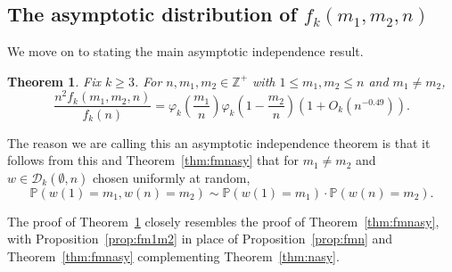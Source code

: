 \documentclass{amsart}
\newtheorem{theorem}{Theorem}[section]
\newtheorem{proposition}[theorem]{Proposition}
\theoremstyle{definition}
\begin{document}

\subsection{The asymptotic distribution of $f_k(m_1,m_2,n)$} We move on to stating the main asymptotic independence result.

\begin{theorem}\label{thm:joint}
Fix $k\geq 3$. For $n,m_1,m_2\in \mathbb{Z}^+$ with $1\leq m_1, m_2\leq n$ and $m_1\neq m_2$,
\[\frac{n^2 f_k(m_1,m_2,n)}{f_k(n)}=\varphi_k\left(\frac{m_1}{n}\right)\varphi_k\left(1-\frac{m_2}{n}\right)\left(1+O_k\left(n^{-0.49}\right)\right).\]
\end{theorem}

The reason we are calling this an asymptotic independence theorem is that it follows from this and Theorem~\ref{thm:fmnasy} that for $m_1\neq m_2$ and $w\in \mathcal{D}_k(\emptyset,n)$ chosen uniformly at random,
\[\mathbb{P}(w(1)=m_1,w(n)=m_2)\sim \mathbb{P}\left(w(1)=m_1\right)\cdot\mathbb{P}\left(w(n)=m_2\right).\]

The proof of Theorem~\ref{thm:joint} closely resembles the proof of Theorem~\ref{thm:fmnasy}, with Proposition~\ref{prop:fm1m2} in place of Proposition~\ref{prop:fmn} and Theorem~\ref{thm:fmnasy} complementing Theorem~\ref{thm:nasy}.
\end{document}
